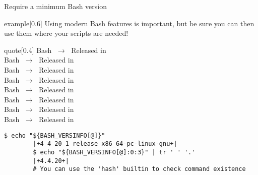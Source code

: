 
\begin{frame}[fragile]{Require a minimum Bash version}
    \vspace{-3mm}
    \begin{varblock}{example}[0.6\textwidth]{}
        Using modern Bash features is important, but be sure you can then use them where your scripts are needed!
    \end{varblock}
    \begin{varblock}{quote}[0.4\textwidth]{}
        \normalfont
        Bash  $\;\longrightarrow\;$ Released in \\
        Bash  $\;\longrightarrow\;$ Released in \\
        Bash  $\;\longrightarrow\;$ Released in \\
        Bash  $\;\longrightarrow\;$ Released in \\
        Bash  $\;\longrightarrow\;$ Released in \\
        Bash  $\;\longrightarrow\;$ Released in \\
        Bash  $\;\longrightarrow\;$ Released in \\
        Bash  $\;\longrightarrow\;$ Released in 
    \end{varblock}
    \begin{lstlisting}[style=MyBash, numbers=none]
        $ echo "${BASH_VERSINFO[@]}"
        |+4 4 20 1 release x86_64-pc-linux-gnu+|
        $ echo "${BASH_VERSINFO[@]:0:3}" | tr ' ' '.'
        |+4.4.20+|
        # You can use the 'hash' builtin to check command existence 
    \end{lstlisting}
\end{frame}
